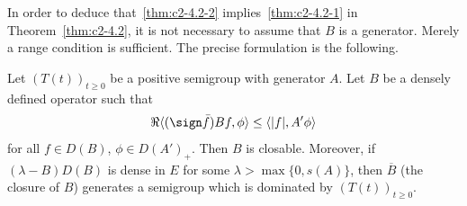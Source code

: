 In order to deduce that~\ref{thm:c2-4.2-2}   implies~\ref{thm:c2-4.2-1}   in Theorem~\ref{thm:c2-4.2}, it is not
necessary to assume that $B$ is a generator. 
Merely a range condition is sufficient. 
The precise formulation is the following.

\begin{theorem}\label{thm:c2-4.3}
Let $(T(t))_{t \geq 0}$ be a positive semigroup with generator $A$. 
Let $B$ be a densely defined operator such that
\begin{equation}\label{eq:c2-4.4}
\Re\langle(\sign  \bar{f})Bf,\phi\rangle \leq \langle|f|,A'\phi\rangle
\end{equation}
for all $f \in D(B)$, $\phi \in D(A')_{+}$.
Then $B$ is closable. 
Moreover, if\/ $(\lambda - B)D(B)$ is dense in $E$ for some $\lambda > \max\{0,s(A)\}$, then $\overline{B}$ (the closure of\/ $B$) generates a
semigroup which is dominated by $(T(t))_{t \geq 0}$.
\end{theorem}
